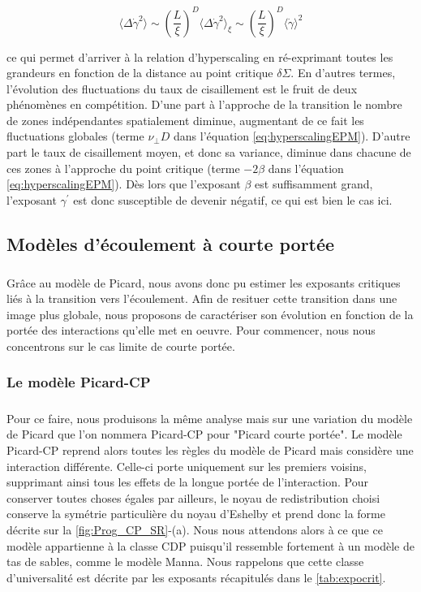 \begin{equation}
	\langle \Delta\dot{\gamma}^2 \rangle \sim \left(\frac{L}{\xi}\right)^D\langle \Delta\dot{\gamma}^2 \rangle_\xi \sim \left(\frac{L}{\xi}\right)^D\langle \dot{\gamma} \rangle^2
\end{equation}

\noindent ce qui permet d'arriver à la relation d'hyperscaling en ré-exprimant toutes les grandeurs en fonction de la distance au point critique $\delta\Sigma$. En d'autres termes, l'évolution des fluctuations du taux de cisaillement est le fruit de deux phénomènes en compétition. D'une part à l'approche de la transition le nombre de zones indépendantes spatialement diminue, augmentant de ce fait les fluctuations globales (terme $\nu_\perp D$ dans l'équation \autoref{eq:hyperscalingEPM}). D'autre part le taux de cisaillement moyen, et donc sa variance, diminue dans chacune de ces zones à l'approche du point critique (terme $-2\beta$ dans l'équation \autoref{eq:hyperscalingEPM}). Dès lors que l'exposant $\beta$ est suffisamment grand, l'exposant $\gamma^\prime$ est donc susceptible de devenir négatif, ce qui est bien le cas ici.

\subsection{Modèles d'écoulement à courte portée}

\subparagraph{}Grâce au modèle de Picard, nous avons donc pu estimer les exposants critiques liés à la transition vers l'écoulement. Afin de resituer cette transition dans une image plus globale, nous proposons de caractériser son évolution en fonction de la portée des interactions qu'elle met en oeuvre. Pour commencer, nous nous concentrons sur le cas limite de courte portée.

\subsubsection{Le modèle Picard-CP}

\subparagraph{} Pour ce faire, nous produisons la même analyse mais sur une variation du modèle de Picard que l'on nommera Picard-CP pour "Picard courte portée". Le modèle Picard-CP reprend alors toutes les règles du modèle de Picard mais considère une interaction différente. Celle-ci porte uniquement sur les premiers voisins, supprimant ainsi tous les effets de la longue portée de l'interaction. Pour conserver toutes choses égales par ailleurs, le noyau de redistribution choisi conserve la symétrie particulière du noyau d'Eshelby et prend donc la forme décrite sur la \autoref{fig:Prog_CP_SR}-(a). Nous nous attendons alors à ce que ce modèle appartienne à la classe CDP puisqu'il ressemble fortement à un modèle de tas de sables, comme le modèle Manna. Nous rappelons que cette classe d'universalité est décrite par les exposants récapitulés dans le \autoref{tab:expocrit}.

